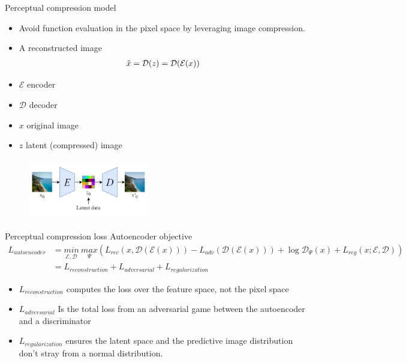 \documentclass[8pt]{beamer}
\begin{document}
\begin{frame}{Perceptual compression model}
    \begin{itemize}
        \item Avoid function evaluation in the pixel space by leveraging image compression.
        \item A reconstructed image
            \begin{align*}
                \Tilde{x} = \mathcal{D}(z) = \mathcal{D}(\mathcal{E}(x))
            \end{align*}
        \item $\mathcal{E}$ encoder
        \item $\mathcal{D}$ decoder
        \item $x$ original image
        \item $z$ latent (compressed) image
    \end{itemize}
   \begin{figure}
       \centering
       \includegraphics[width=150pt, height=75pt]{images/perceptual_loss_encoder.png}
       \label{fig:NN_training}
   \end{figure} 
   \cite{steins}
\end{frame}



\begin{frame}{Perceptual compression loss}
    Autoencoder objective
    \begin{align*}
        L_{autoencoder} &= \underset{\mathcal{E},\mathcal{D}}{min}\:\underset{\Psi}{max} (L_{rec}(x, \mathcal{D}(\mathcal{E}(x))) - L_{adv}(\mathcal{D}(\mathcal{E}(x))) + \log \mathcal{D}_{\Psi}(x) + L_{reg}(x;\mathcal{E}, \mathcal{D})) \\
        &= L_{reconstruction} + L_{adversarial} + L_{regularization}
    \end{align*}
    \begin{itemize}
        \item $L_{reconstruction}$ computes the loss over the feature space, not the pixel space
        \item $L_{adversarial}$ Is the total loss from an adversarial game between the autoencoder and a discriminator
        \item $L_{regularization}$ ensures the latent space and the predictive image distribution don't stray from a normal distribution.
    \end{itemize}
\end{frame}
\end{document}
